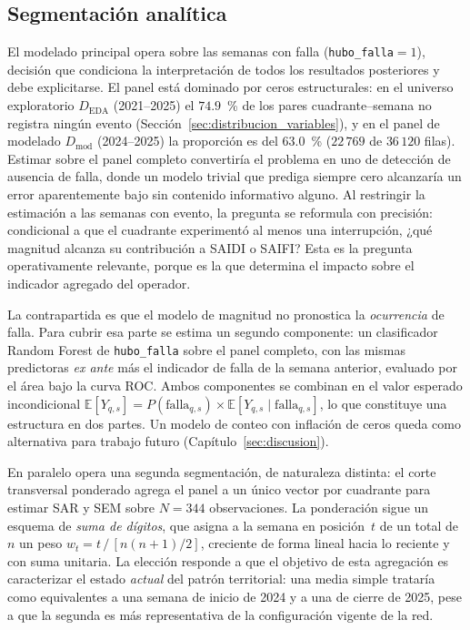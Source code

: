 \subsection{Segmentación analítica}
\label{sec:segmentacion_analitica}
El modelado principal opera sobre las semanas con falla (\texttt{hubo\_falla}$=1$), decisión que condiciona la interpretación de todos los resultados posteriores y debe explicitarse. El panel está dominado por ceros estructurales: en el universo exploratorio $D_{\mathrm{EDA}}$ (2021--2025) el $74{.}9$~\% de los pares cuadrante--semana no registra ningún evento (Sección~\ref{sec:distribucion_variables}), y en el panel de modelado $D_{\mathrm{mod}}$ (2024--2025) la proporción es del $63{.}0$~\% ($22\,769$ de $36\,120$ filas). Estimar sobre el panel completo convertiría el problema en uno de detección de ausencia de falla, donde un modelo trivial que prediga siempre cero alcanzaría un error aparentemente bajo sin contenido informativo alguno. Al restringir la estimación a las semanas con evento, la pregunta se reformula con precisión: condicional a que el cuadrante experimentó al menos una interrupción, ¿qué magnitud alcanza su contribución a SAIDI o SAIFI? Esta es la pregunta operativamente relevante, porque es la que determina el impacto sobre el indicador agregado del operador.

La contrapartida es que el modelo de magnitud no pronostica la \textit{ocurrencia} de falla. Para cubrir esa parte se estima un segundo componente: un clasificador Random Forest de \texttt{hubo\_falla} sobre el panel completo, con las mismas predictoras \emph{ex ante} más el indicador de falla de la semana anterior, evaluado por el área bajo la curva ROC. Ambos componentes se combinan en el valor esperado incondicional $\mathbb{E}[Y_{q,s}] = P(\text{falla}_{q,s})\times\mathbb{E}[Y_{q,s}\mid\text{falla}_{q,s}]$, lo que constituye una estructura en dos partes. Un modelo de conteo con inflación de ceros queda como alternativa para trabajo futuro (Capítulo~\ref{sec:discusion}).

En paralelo opera una segunda segmentación, de naturaleza distinta: el corte transversal ponderado agrega el panel a un único vector por cuadrante para estimar SAR y SEM sobre $N=344$ observaciones. La ponderación sigue un esquema de \textit{suma de dígitos}, que asigna a la semana en posición~$t$ de un total de~$n$ un peso $w_t = t\,/\,[n(n+1)/2]$, creciente de forma lineal hacia lo reciente y con suma unitaria. La elección responde a que el objetivo de esta agregación es caracterizar el estado \textit{actual} del patrón territorial: una media simple trataría como equivalentes a una semana de inicio de 2024 y a una de cierre de 2025, pese a que la segunda es más representativa de la configuración vigente de la red.

